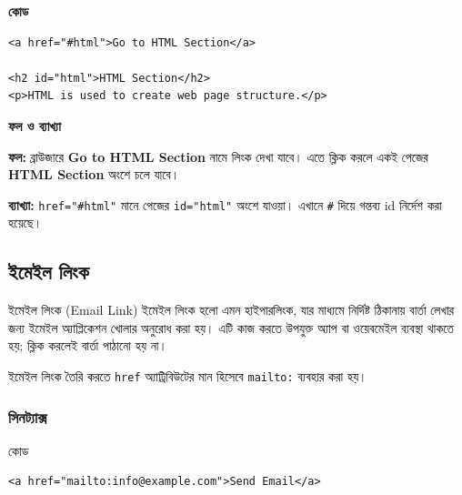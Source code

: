 \par\noindent
\begin{minipage}[t]{.54\linewidth}\vspace{0pt}\small
\textbf{\color{chFourTeal}কোড}\par
\begin{verbatim}
<a href="#html">Go to HTML Section</a>

<h2 id="html">HTML Section</h2>
<p>HTML is used to create web page structure.</p>
\end{verbatim}

\par\smallskip
\end{minipage}\hfill
\begin{minipage}[t]{.42\linewidth}\vspace{0pt}\small
\textbf{\color{chFourTeal}ফল ও ব্যাখ্যা}\par
\textbf{ফল:} ব্রাউজারে \textbf{Go to HTML Section} নামে লিংক দেখা যাবে। এতে ক্লিক করলে একই পেজের \textbf{HTML Section} অংশে চলে যাবে।

\textbf{ব্যাখ্যা:} \texttt{href="\#html"} মানে পেজের \texttt{id="html"} অংশে যাওয়া। এখানে \texttt{\#} দিয়ে গন্তব্য id নির্দেশ করা হয়েছে।
\par\smallskip
\end{minipage}\par




\subsection{ইমেইল লিংক}

\begin{definitionbox}{ইমেইল লিংক (Email Link)}
ইমেইল লিংক হলো এমন হাইপারলিংক, যার মাধ্যমে নির্দিষ্ট ঠিকানায় বার্তা লেখার জন্য ইমেইল অ্যাপ্লিকেশন খোলার অনুরোধ করা হয়। এটি কাজ করতে উপযুক্ত অ্যাপ বা ওয়েবমেইল ব্যবস্থা থাকতে হয়; ক্লিক করলেই বার্তা পাঠানো হয় না।
\end{definitionbox}

ইমেইল লিংক তৈরি করতে \texttt{href} অ্যাট্রিবিউটের মান হিসেবে \texttt{mailto:} ব্যবহার করা হয়।

\subsubsection{সিনট্যাক্স}

\begin{examplebox}{কোড}
\par\noindent\begin{minipage}{\linewidth}
\begin{verbatim}
<a href="mailto:info@example.com">Send Email</a>
\end{verbatim}
\end{minipage}\par
\end{examplebox}

